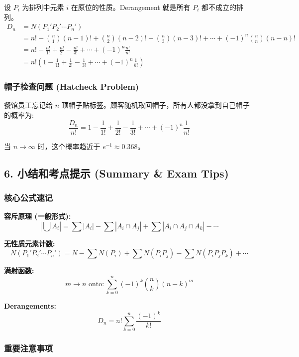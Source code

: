 \documentclass[10pt,a4paper,openany]{ctexbook}
\theoremstyle{definition}
\theoremstyle{remark}
\begin{document}
设 $P_i$ 为排列中元素 $i$ 在原位的性质。Derangement 就是所有 $P_i$ 都不成立的排列。
\[
\begin{aligned}
D_n &= N(P_1' P_2' \cdots P_n') \\
&= n! - \binom{n}{1}(n-1)! + \binom{n}{2}(n-2)! - \binom{n}{3}(n-3)! + \cdots + (-1)^n \binom{n}{n}(n-n)! \\
&= n! - \frac{n!}{1!} + \frac{n!}{2!} - \frac{n!}{3!} + \cdots + (-1)^n \frac{n!}{n!} \\
&= n! \left(1 - \frac{1}{1!} + \frac{1}{2!} - \frac{1}{3!} + \cdots + (-1)^n \frac{1}{n!}\right)
\end{aligned}
\]

\subsubsection{帽子检查问题 (Hatcheck Problem)}

餐馆员工忘记给 $n$ 顶帽子贴标签。顾客随机取回帽子，所有人都没拿到自己帽子的概率为:
\[
\frac{D_n}{n!} = 1 - \frac{1}{1!} + \frac{1}{2!} - \frac{1}{3!} + \cdots + (-1)^n \frac{1}{n!}
\]

当 $n \to \infty$ 时，这个概率趋近于 $e^{-1} \approx 0.368$。
\vspace{-2pt}

\subsection{6. 小结和考点提示 (Summary \& Exam Tips)}

\subsubsection{核心公式速记}

\textbf{容斥原理 (一般形式):}
\[
|\bigcup A_i| = \sum|A_i| - \sum|A_i \cap A_j| + \sum|A_i \cap A_j \cap A_k| - \cdots
\]

\textbf{无性质元素计数:}
\[
N(P_1'P_2'\cdots P_n') = N - \sum N(P_i) + \sum N(P_i P_j) - \sum N(P_i P_j P_k) + \cdots
\]

\textbf{满射函数:}
\[
m \to n \text{ onto}: \sum_{k=0}^n (-1)^k \binom{n}{k}(n-k)^m
\]

\textbf{Derangements:}
\[
D_n = n! \sum_{k=0}^n \frac{(-1)^k}{k!}
\]

\subsubsection{重要注意事项}
\end{document}
